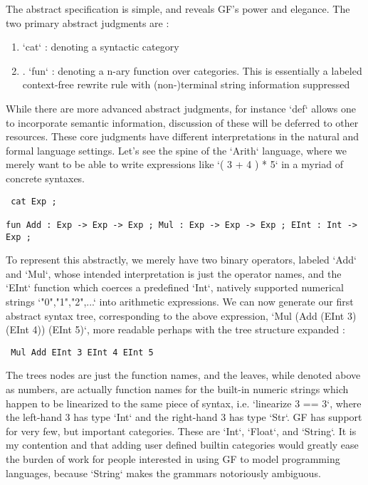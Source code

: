 \documentclass[11pt, a4paper]{article}
\begin{document}
The abstract specification is simple, and reveals GF's power and elegance. The
two primary abstract judgments are :

\begin{enumerate}
\item `cat` : denoting a syntactic category
\item. `fun` : denoting a n-ary function over categories. This is essentially a
labeled context-free rewrite rule with (non-)terminal string information
suppressed
\end{enumerate}

While there are more advanced abstract judgments, for instance `def` allows one
to incorporate semantic information, discussion of these will be deferred to
other resources. These core judgments have different interpretations in the
natural and formal language settings. Let's see the spine of the `Arith`
language, where we merely want to be able to write expressions like `( 3 + 4 ) *
5` in a myriad of concrete syntaxes.

\begin{verbatim} cat Exp ;

fun Add : Exp -> Exp -> Exp ; Mul : Exp -> Exp -> Exp ; EInt : Int -> Exp ;
\end{verbatim}

To represent this abstractly, we merely have two binary operators, labeled `Add`
and `Mul`, whose intended interpretation is just the operator names, and the
`EInt` function which coerces a predefined `Int`, natively supported numerical
strings `"0","1","2",...` into arithmetic expressions. We can now generate our
first abstract syntax tree, corresponding to the above expression, `Mul (Add
(EInt 3) (EInt 4)) (EInt 5)`, more readable perhaps with the tree structure
expanded :

\begin{verbatim} Mul Add EInt 3 EInt 4 EInt 5
\end{verbatim}

The trees nodes are just the function names, and the leaves, while denoted above
as numbers, are actually function names for the built-in numeric strings which
happen to be linearized to the same piece of syntax, i.e. `linearize 3 == 3`,
where the left-hand 3 has type `Int` and the right-hand 3 has type `Str`. GF has
support for very few, but important categories. These are `Int`, `Float`, and
`String`. It is my contention and that adding user defined builtin categories
would greatly ease the burden of work for people interested in using GF to model
programming languages, because `String` makes the grammars notoriously
ambiguous.
\end{document}

